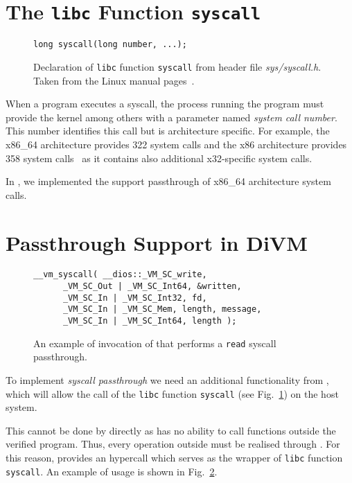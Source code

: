 \section{The \texttt{libc} Function \texttt{syscall} }  \label{sec:passthrough:syscall}

\begin{figure}[h!]
\begin{lstlisting}
long syscall(long number, ...);
\end{lstlisting}
\caption{
    Declaration of \texttt{libc} function \texttt{syscall} from header file \textit{sys/syscall.h}. Taken from the Linux manual pages~\cite{Man_syscall}.
}
\label{fig:passthrough:syscall}
\end{figure}

When a program executes a syscall, the process running the program must provide the kernel among others with a parameter named \textit{system call number}. This number identifies this call but is architecture specific. For example, the x86\_64 architecture provides 322 system calls and the x86 architecture provides 358 system calls~\cite{LinuxTable} as it contains also additional x32-specific system calls.

In \divine, we implemented the support passthrough of x86\_64 architecture system calls.


\section{Passthrough Support in DiVM}  \label{sec:passthrough:vmsyscall}

\begin{figure}[h!]
\begin{lstlisting}[style=Macro]
__vm_syscall( __dios::_VM_SC_write,
      _VM_SC_Out | _VM_SC_Int64, &written,
      _VM_SC_In | _VM_SC_Int32, fd,
      _VM_SC_In | _VM_SC_Mem, length, message,
      _VM_SC_In | _VM_SC_Int64, length );
\end{lstlisting}
\caption{
    An example of invocation of \vmsyscall that performs a \texttt{read} syscall passthrough.
}
\label{fig:passthrough:writePassthrough}
\end{figure}

To implement \textit{syscall passthrough} we need an additional functionality from \divine, which will allow the call of the \texttt{libc} function \texttt{syscall}  (see Fig.~\ref{sec:passthrough:syscall}) on the host system. 

This cannot be done by \dios directly as \dios has no ability to call functions outside the verified program. Thus, every operation outside \divine must be realised through \divm. For this reason, \divm provides an hypercall  \vmsyscall which serves as the wrapper of \texttt{libc} function \texttt{syscall}. An example of usage is shown in Fig.~\ref{fig:passthrough:writePassthrough}.


